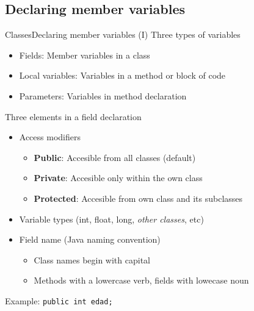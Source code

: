 \documentclass[10pt,compress]{beamer} %
\begin{document}
\subsection{Declaring member variables}
\begin{frame}{Classes}{Declaring member variables (I)}
	Three types of variables
	\begin{itemize}
		\item Fields: Member variables in a class
		\item Local variables: Variables in a method or block of code
		\item Parameters: Variables in method declaration
	\end{itemize}

	Three elements in a field declaration
	\begin{itemize}
		\item Access modifiers
			\begin{itemize}
			\item \textbf{Public}: Accesible from all classes (default)
			\item \textbf{Private}: Accesible only within the own class
			\item \textbf{Protected}: Accesible from own class and its subclasses
			\end{itemize}
		\item Variable types (int, float, long, \textit{other classes}, etc)
		\item Field name (Java naming convention)
			\begin{itemize}
			\item \alert{Class names begin with capital}
			\item \alert{Methods with a lowercase verb, fields with lowecase noun}
			\end{itemize}
	\end{itemize}

	\centering Example: \texttt{public int edad;}
\end{frame}
\end{document}
